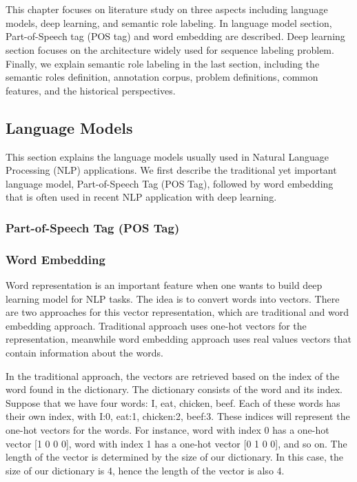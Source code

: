 \chapter{\babDua}
This chapter focuses on literature study on three aspects including language models, deep learning, and semantic role labeling. In language model section, Part-of-Speech tag (POS tag) and word embedding are described. Deep learning section focuses on the architecture widely used for sequence labeling problem. Finally, we explain semantic role labeling in the last section, including the semantic roles definition, annotation corpus, problem definitions, common features, and the historical perspectives.
\section{Language Models}
This section explains the language models usually used in Natural Language Processing (NLP) applications. We first describe the traditional yet important language model, Part-of-Speech Tag (POS Tag), followed by word embedding that is often used in recent NLP application with deep learning.

\subsection{Part-of-Speech Tag (POS Tag)}

\subsection{Word Embedding}
Word representation is an important feature when one wants to build deep learning model for NLP tasks. The idea is to convert words into vectors. There are two approaches for this vector representation, which are traditional and word embedding approach. Traditional approach uses one-hot vectors for the representation, meanwhile word embedding approach uses real values vectors that contain information about the words.

In the traditional approach, the vectors are retrieved based on the index of the word found in the dictionary. The dictionary consists of the word and its index. Suppose that we have four words: I, eat, chicken, beef. Each of these words has their own index, with I:0, eat:1, chicken:2, beef:3. These indices will represent the one-hot vectors for the words. For instance, word with index 0 has a one-hot vector [1 0 0 0], word with index 1 has a one-hot vector [0 1 0 0], and so on. The length of the vector is determined by the size of our dictionary. In this case, the size of our dictionary is 4, hence the length of the vector is also 4. 

